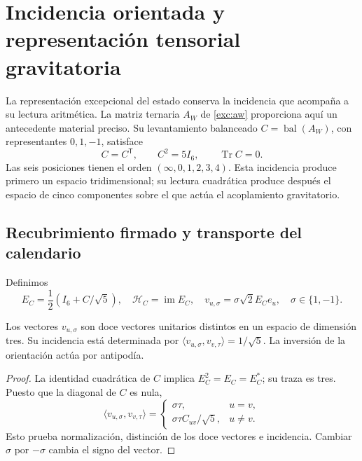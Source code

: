 \section{Incidencia orientada y representación tensorial gravitatoria}
\label{vii:sec:pentacomponente}
La representación excepcional del estado conserva la incidencia que acompaña
a su lectura aritmética. La matriz ternaria \(A_W\) de
\eqref{exc:aw} proporciona aquí un antecedente material preciso. Su
levantamiento balanceado \(C=\operatorname{bal}(A_W)\), con representantes
\(0,1,-1\), satisface
\[
 C=C^{\mathsf T},\qquad C^2=5I_6,\qquad \operatorname{Tr}C=0.
\]
Las seis posiciones tienen el orden \((\infty,0,1,2,3,4)\).
Esta incidencia produce primero un espacio tridimensional; su lectura
cuadrática produce después el espacio de cinco componentes sobre el que
actúa el acoplamiento gravitatorio.

\subsection{Recubrimiento firmado y transporte del calendario}
Definimos
\[
 E_C=\frac12(I_6+C/\sqrt5),\quad
 \mathcal H_C=\operatorname{im}E_C,\quad
 v_{u,\sigma}=\sigma\sqrt2E_Ce_u,\quad \sigma\in\{1,-1\}.
\]
\begin{proposition}
\label{vii:prop:doce-orientadas}
Los vectores \(v_{u,\sigma}\) son doce vectores unitarios distintos
en un espacio de dimensión tres. Su incidencia está determinada por
\(\langle v_{u,\sigma},v_{v,\tau}\rangle=1/\sqrt5\).
La inversión de la orientación actúa por antipodía.
\end{proposition}
\begin{proof}
La identidad cuadrática de \(C\) implica \(E_C^2=E_C=E_C^*\);
su traza es tres. Puesto que la diagonal de \(C\) es nula,
\[
 \langle v_{u,\sigma},v_{v,\tau}\rangle
 =\begin{cases}\sigma\tau,&u=v,\\
 \sigma\tau C_{uv}/\sqrt5,&u\ne v.
 \end{cases}
\]
Esto prueba normalización, distinción de los doce vectores e incidencia.
Cambiar \(\sigma\) por \(-\sigma\) cambia el signo del vector.
\end{proof}

